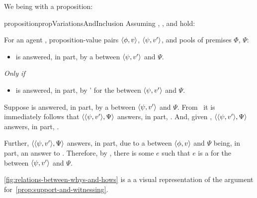 \begin{note}
 We being with a proposition:

  \begin{restatable}[]{proposition}{propVariationsAndInclusion}
    \label{prop:support-and-witnessing}
    Assuming \linkW{}, \linkH{}, and \issueInclusion{} hold:

    For an agent \vAgent{}, proposition-value pairs \(\langle \phi, v \rangle\), \(\langle \psi, v' \rangle\), and pools of premises \(\Phi\), \(\Psi\):

    \begin{itemize}
    \item
      \qWhyVnP{} is answered, in part, by a \ros{} between \(\langle \psi, v' \rangle\) and \(\Psi\).
    \end{itemize}

    \emph{Only if}

    \begin{itemize}
    \item
      \qHowV{} is answered, in part, by \vAgent{}'  for the \ros{} between \(\langle \psi, v' \rangle\) and \(\Psi\).
    \end{itemize}
    \begin{argument}
      Suppose \qWhyVnP{} is answered, in part, by a \ros{} between \(\langle \psi, v' \rangle\) and \(\Psi\).
      From~\linkW{} it is immediately follows that \(\langle \langle \psi, v' \rangle, \Psi \rangle\) answers, in part, \qWhy{}.
      And, given \issueInclusion{}, \(\langle \langle \psi, v' \rangle, \Psi \rangle\) answers, in part, \qHow{}.

      Further, \(\langle \langle \psi, v' \rangle, \Psi \rangle\) answers, in part, \qHow{} due to a \ros{} between \(\langle \phi, v \rangle\) and \(\Psi\) being, in part, an answer to \qWhyVnP{}.
      Therefore, by \linkH{}, there is some \(e\) such that \(e\) is a  for the \ros{} between \(\langle \psi, v' \rangle\) and \(\Psi\).
    \end{argument}
  \end{restatable}
  \autoref{fig:relations-between-whys-and-hows} is a a visual representation of the argument for~\autoref{prop:support-and-witnessing}.
\end{note}

